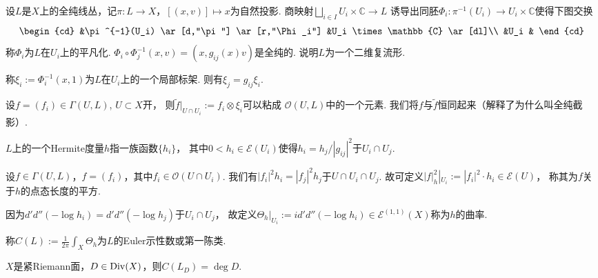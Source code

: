 \begin{definition}
    设$L$是$X$上的全纯线丛，记$\pi\colon L\rightarrow X$，$[(x,v)]\mapsto x$为自然投影. 
    商映射$\bigsqcup\limits_{i\in I} U_i\times \mathbb{C}\rightarrow L$
    诱导出同胚$\Phi_i\colon\pi^{-1}(U_i)\rightarrow U_i\times \mathbb{C}$使得下图交换
	\[\begin{cd}
		&\pi^{-1}(U_i) \ar[d,"\pi"] \ar[r,"\Phi_i"] &U_i \times \mathbb{C} \ar[dl]\\
		&U_i &
	\end{cd}\]
	称$\Phi_i$为$L$在$U_i$上的平凡化. 
    $\Phi_i\circ \Phi_j^{-1}(x,v)=(x,g_{ij}(x)v)$是全纯的. 说明$L$为一个二维复流形.

	称$\xi_i:=\Phi_i^{-1}(x,1)$为$L$在$U_i$上的一个局部标架. 
    则有$\xi_j=g_{ij}\xi_i$.\par
			
	设$f=(f_i)\in \Gamma(U,L)$, $U\subset X$开，
    则$\tilde{f}|_{U\cap U_i}:=f_i \otimes \xi_i$可以粘成 $\mathcal{O}(U,L)$中的一个元素. 
    我们将$f$与$\tilde{f}$恒同起来（解释了为什么叫全纯截影）.
\end{definition}

\begin{definition}
	$L$上的一个Hermite度量$h$指一族函数$\{h_i\}$，
    其中$0<h_i\in \mathcal{E}(U_i)$使得$h_i=h_j/|g_{ij}|^2$于$U_i\cap U_j$.

	设$f\in \Gamma(U,L)$，$f=(f_i)$，其中$f_i\in \mathcal{O}(U\cap U_i)$.
    我们有$|f_i|^2 h_i=|f_j|^2 h_j$于$U\cap U_i\cap U_j$. 
    故可定义$|f|^2_h|_{U_i}:=|f_i|^2 \cdot h_i \in \mathcal{E}(U)$，
    称其为$f$关于$h$的点态长度的平方.
\end{definition}

\begin{definition}
	因为$d'd''(-\log h_i)=d'd''(-\log h_j)$于$U_i\cap U_j$，
    故定义$\Theta_h|_{U_i}:=id'd''(-\log h_i)\in \mathcal{E}^{(1,1)}(X)$称为$h$的曲率.
\end{definition}
	
\begin{definition}
	称$C(L):=\frac{1}{2\pi}\int_X \Theta_h$为$L$的Euler示性数或第一陈类.
\end{definition}
				
\begin{theorem}
	$X$是紧Riemann面，$D\in \operatorname{Div}(X)$，则$C(L_D)=\deg D$.
\end{theorem}

